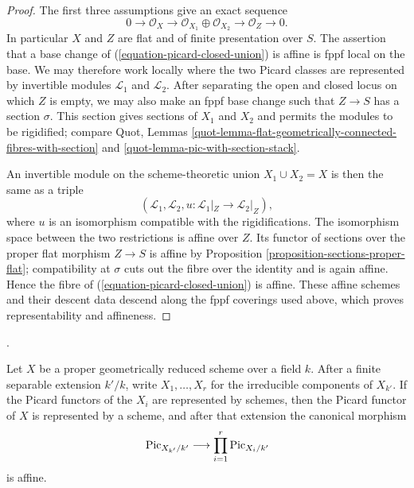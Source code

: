 \begin{proof}
The first three assumptions give an exact sequence
$$
0 \longrightarrow \mathcal{O}_X \longrightarrow
\mathcal{O}_{X_1} \oplus \mathcal{O}_{X_2} \longrightarrow
\mathcal{O}_Z \longrightarrow 0.
$$
In particular $X$ and $Z$ are flat and of finite presentation over $S$.
The assertion that a base change of
(\ref{equation-picard-closed-union}) is affine is fppf local on the base.
We may therefore work locally where the two Picard classes are represented
by invertible modules $\mathcal{L}_1$ and $\mathcal{L}_2$. After separating
the open and closed locus on which $Z$ is empty, we may also make an fppf
base change such that $Z \to S$ has a section $\sigma$. This section gives
sections of $X_1$ and $X_2$ and permits the modules to be rigidified; compare
Quot, Lemmas \ref{quot-lemma-flat-geometrically-connected-fibres-with-section}
and \ref{quot-lemma-pic-with-section-stack}.

An invertible module on the scheme-theoretic union $X_1 \cup X_2 = X$ is
then the same as a triple
$$
(\mathcal{L}_1, \mathcal{L}_2,
u : \mathcal{L}_1|_Z \longrightarrow \mathcal{L}_2|_Z),
$$
where $u$ is an isomorphism compatible with the rigidifications. The
isomorphism space between the two restrictions is affine over $Z$. Its
functor of sections over the proper flat morphism $Z \to S$ is affine by
Proposition \ref{proposition-sections-proper-flat}; compatibility at
$\sigma$ cuts out the fibre over the identity and is again affine. Hence
the fibre of (\ref{equation-picard-closed-union}) is affine. These affine
schemes and their descent data descend along the fppf coverings used above,
which proves representability and affineness.
\end{proof}

\begin{lemma}
\label{corollary-picard-reduced-components}
\begin{reference}
\cite[Expos\'e 232, Corollary 6.4, p. 159]{FGA}.
\end{reference}
Let $X$ be a proper geometrically reduced scheme over a field $k$. After a
finite separable extension $k'/k$, write $X_1, \ldots, X_r$ for the
irreducible components of $X_{k'}$. If the Picard functors of the $X_i$ are
represented by schemes, then the Picard functor of $X$ is represented by a
scheme, and
after that extension the canonical morphism
$$
\mathrm{Pic}_{X_{k'}/k'} \longrightarrow
\prod_{i = 1}^r \mathrm{Pic}_{X_i/k'}
$$
is affine.
\end{lemma}

